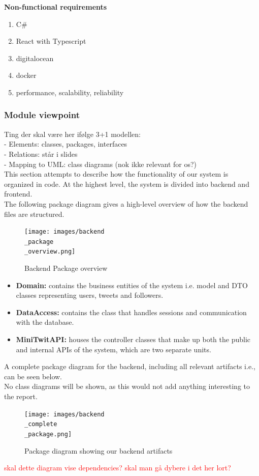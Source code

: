 \noindent
\textbf{Non-functional requirements}
\begin{enumerate}
    \item C\# 
    \item React with Typescript 
    \item digitalocean
    \item docker
    \item performance, scalability, reliability
\end{enumerate}


    
    
\subsubsection{Module viewpoint}
Ting der skal være her ifølge 3+1 modellen: \\
- Elements: classes, packages, interfaces \\
- Relations: står i slides \\
- Mapping to UML: class diagrams (nok ikke relevant for os?) \\


This section attempts to describe how the functionality of our system is organized in code. 
At the highest level, the system is divided into backend and frontend.\\

The following package diagram gives a high-level overview of how the backend files are structured.
\begin{figure}[H]
 \centering
 \texttt{[image: images/backend\\\_package\\\_overview.png]}
 \caption{Backend Package overview}
 \label{fig:BackendPackageDiagram}
\end{figure}
\begin{itemize}
    \item \textbf{Domain:} contains the business entities of the system i.e. model and DTO classes representing users, tweets and followers.
    \item \textbf{DataAccess:} contains the class that handles sessions and communication with the database.
    \item \textbf{MiniTwitAPI:} houses the controller classes that make up both the public and internal APIs of the system, which are two separate units. 
\end{itemize}
A complete package diagram for the backend, including all relevant artifacts i.e., can be seen below. \\
No class diagrams will be shown, as this would not add anything interesting to the report. \\
\begin{figure}[H]
 \centering
 \texttt{[image: images/backend\\\_complete\\\_package.png]}
 \caption{Package diagram showing our backend artifacts}
 \label{fig:BackendCompletePackageDiagram}
\end{figure}
\textcolor{red}{skal dette diagram vise dependencies?}
\textcolor{red}{skal man gå dybere i det her lort?} \\

